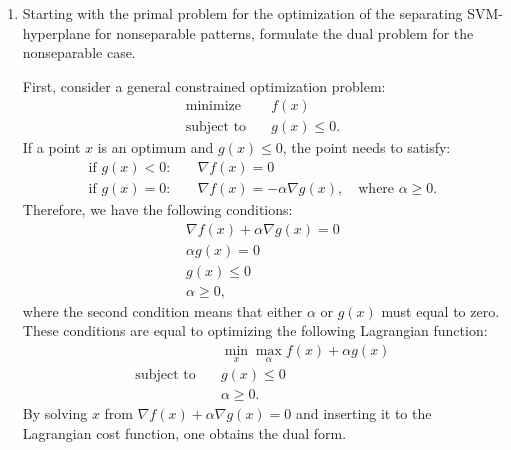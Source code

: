 \begin{enumerate}

\item Starting with the primal problem for the optimization of the
  separating SVM-hyperplane for nonseparable patterns, formulate the
  dual problem for the nonseparable case.

  \begin{solution}

    First, consider a general constrained optimization problem:
    \begin{align*}
      \text{minimize}& \quad f(x)
      \\
      \text{subject to}& \quad g(x) \leq 0.
    \end{align*}
    If a point $x$ is an optimum and $g(x)\leq 0$, the point needs to
    satisfy:
    \begin{align*}
      \text{if } g(x)<0:& \quad \nabla f(x) = 0
      \\
      \text{if } g(x)=0:& \quad \nabla f(x) = -\alpha \nabla g(x),
      \quad \text{where } \alpha \geq 0.
    \end{align*}
    Therefore, we have the following conditions:
    \begin{align*}
      \nabla f(x) + \alpha \nabla g(x) = 0
      \\
      \alpha g(x) = 0
      \\
      g(x) \leq 0
      \\
      \alpha \geq 0,
    \end{align*}
    where the second condition means that either $\alpha$ or $g(x)$
    must equal to zero.  These conditions are equal to optimizing the
    following Lagrangian function:
    \begin{align*}
      & \quad \min_x \max_\alpha f(x) + \alpha g(x)
      \\
      \text{subject to} &\quad g(x) \leq 0
      \\
      &\quad \alpha \geq 0.
    \end{align*}
    By solving $x$ from $\nabla f(x) + \alpha \nabla g(x) = 0$ and
    inserting it to the Lagrangian cost function, one obtains the dual
    form.


\end{solution}
\end{enumerate}
